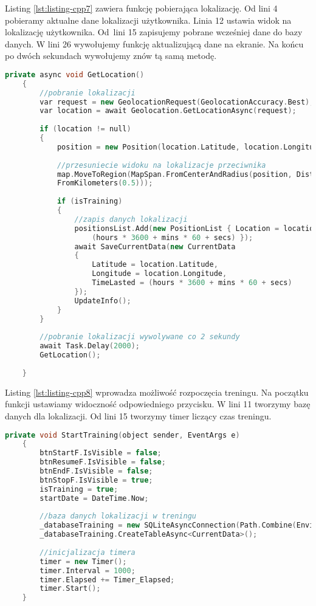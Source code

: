 Listing \ref{lst:listing-cpp7} zawiera funkcję pobierająca lokalizację. Od lini 4 pobieramy aktualne dane lokalizacji użytkownika. Linia 12 ustawia widok na lokalizację użytkownika. Od~lini 15 zapisujemy pobrane wcześniej dane do bazy danych.
W lini 26 wywołujemy funkcję aktualizującą dane na ekranie. Na końcu po dwóch sekundach wywołujemy znów tą samą metodę.
\begin{lstlisting}[caption=Pobranie lokalizacji, label={lst:listing-cpp7}, language=C++]
	private async void GetLocation()
	{
		//pobranie lokalizacji
		var request = new GeolocationRequest(GeolocationAccuracy.Best);
		var location = await Geolocation.GetLocationAsync(request);
		
		if (location != null)
		{
			position = new Position(location.Latitude, location.Longitude);
			
			//przesuniecie widoku na lokalizacje przeciwnika
			map.MoveToRegion(MapSpan.FromCenterAndRadius(position, Distance.
			FromKilometers(0.5)));
			
			if (isTraining)
			{   
				//zapis danych lokalizacji
				positionsList.Add(new PositionList { Location = location, TimeLasted = 
					(hours * 3600 + mins * 60 + secs) });
				await SaveCurrentData(new CurrentData
				{
					Latitude = location.Latitude,
					Longitude = location.Longitude,
					TimeLasted = (hours * 3600 + mins * 60 + secs)
				});
				UpdateInfo();
			}			
		}
		
		//pobranie lokalizacji wywolywane co 2 sekundy
		await Task.Delay(2000);
		GetLocation();
		
	}
\end{lstlisting}

Listing \ref{lst:listing-cpp8} wprowadza możliwość rozpoczęcia treningu. Na początku funkcji ustawiamy widoczność odpowiedniego przycisku. W lini 11 tworzymy bazę danych dla lokalizacji. Od lini 15 tworzymy timer liczący czas treningu.
\begin{lstlisting}[caption=Rozpoczęcie treningu, label={lst:listing-cpp8}, language=C++]
	private void StartTraining(object sender, EventArgs e)
	{
		btnStartF.IsVisible = false;
		btnResumeF.IsVisible = false;
		btnEndF.IsVisible = false;
		btnStopF.IsVisible = true;
		isTraining = true;
		startDate = DateTime.Now;
		
		//baza danych lokalizacji w treningu
		_databaseTraining = new SQLiteAsyncConnection(Path.Combine(Environment.GetFolderPath(Environment.SpecialFolder.LocalApplicationData), "training" + startDate.ToString("dd_MM_yyyy_HH_mm_ss") + ".db3"));
		_databaseTraining.CreateTableAsync<CurrentData>();
		
		//inicjalizacja timera
		timer = new Timer();
		timer.Interval = 1000;
		timer.Elapsed += Timer_Elapsed;
		timer.Start();
	}
\end{lstlisting}


